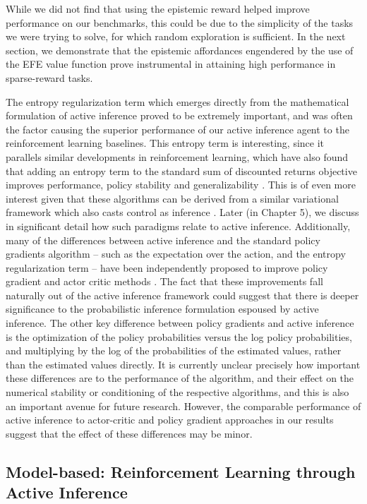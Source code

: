 While we did not find that using the epistemic reward helped improve performance on our benchmarks, this could be due to the simplicity of the tasks we were trying to solve, for which random exploration is sufficient. In the next section, we demonstrate that the epistemic affordances engendered by the use of the EFE value function prove instrumental in attaining high performance in sparse-reward tasks.

The entropy regularization term which emerges directly from the mathematical formulation of active inference proved to be extremely important, and was often the factor causing the superior performance of our active inference agent to the reinforcement learning baselines. This entropy term is interesting, since it parallels similar developments in reinforcement learning, which have also found that adding an entropy term to the standard sum of discounted returns objective improves performance, policy stability and generalizability \citep*{haarnoja2017reinforcement,haarnoja2018acquiring}. This is of even more interest given that these algorithms can be derived from a similar variational framework which also casts control as inference \citep*{levine2018reinforcement}. Later (in Chapter 5), we discuss in significant detail how such paradigms relate to active inference. Additionally, many of the differences between active inference and the standard policy gradients algorithm -- such as the expectation over the action, and the entropy regularization term  -- have been independently proposed to improve policy gradient and actor critic methods \citep{fujimoto2018addressing}. The fact that these improvements fall naturally out of the active inference framework could suggest that there is deeper significance to the probabilistic inference formulation espoused by active inference. The other key difference between policy gradients and active inference is the optimization of the policy probabilities versus the log policy probabilities, and multiplying by the log of the probabilities of the estimated values, rather than the estimated values directly. It is currently unclear precisely how important these differences are to the performance of the algorithm, and their effect on the numerical stability or conditioning of the respective algorithms, and this is also an important avenue for future research. However, the comparable performance of active inference to actor-critic and policy gradient approaches in our results suggest that the effect of these differences may be minor.

\subsection{Model-based: Reinforcement Learning through Active Inference}

